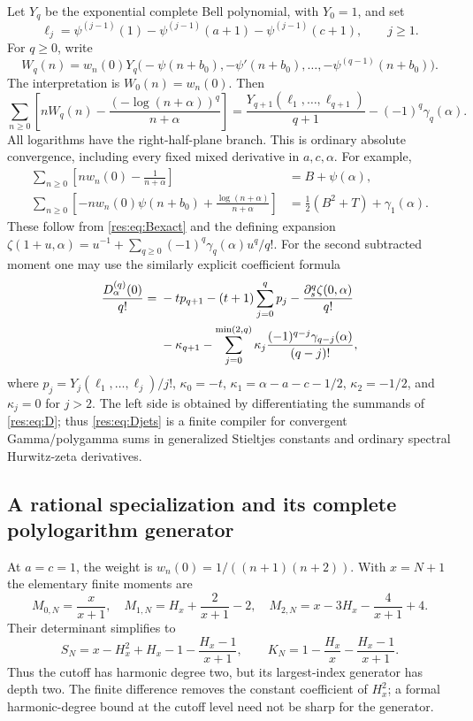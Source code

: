 Let $Y_q$ be the exponential complete Bell polynomial, with $Y_0=1$,
and set
\[
 \ell_j=\psi^{(j-1)}(1)-\psi^{(j-1)}(a+1)
                    -\psi^{(j-1)}(c+1),\qquad j\geq1.
\]
For $q\geq0$, write
\[
 W_q(n)=w_n(0)Y_q\bigl(-\psi(n+b_0),-\psi'(n+b_0),
                         \ldots,-\psi^{(q-1)}(n+b_0)\bigr).
\]
The interpretation is $W_0(n)=w_n(0)$.  Then
\begin{equation}
 \boxed{\sum_{n\geq0}\left[
 nW_q(n)-\frac{(-\log(n+\alpha))^q}{n+\alpha}\right]
 =\frac{Y_{q+1}(\ell_1,\ldots,\ell_{q+1})}{q+1}
       -(-1)^q\gamma_q(\alpha).}\label{res:eq:Stieltjes}
\end{equation}
All logarithms have the right-half-plane branch.  This is ordinary
absolute convergence, including every fixed mixed derivative in
$a,c,\alpha$.  For example,
\begin{align*}
 \sum_{n\geq0}\left[nw_n(0)-\frac1{n+\alpha}\right]
   &=B+\psi(\alpha),\\
 \sum_{n\geq0}\left[-nw_n(0)\psi(n+b_0)
                 +\frac{\log(n+\alpha)}{n+\alpha}\right]
   &=\tfrac12(B^2+T)+\gamma_1(\alpha).
\end{align*}
These follow from \eqref{res:eq:Bexact} and the defining expansion
$\zeta(1+u,\alpha)=u^{-1}+\sum_{q\geq0}(-1)^q\gamma_q(\alpha)u^q/q!$.
For the second subtracted moment one may use the similarly explicit
coefficient formula
\begin{align}
 \frac{D_\alpha^{(q)}(0)}{q!}
 ={}&-t p_{q+1}-(t+1)\sum_{j=0}^q p_j
     -\frac{\partial_s^q\zeta(0,\alpha)}{q!}\notag\\
 &-\kappa_{q+1}
     -\sum_{j=0}^{\min(2,q)}\kappa_j
                    \frac{(-1)^{q-j}\gamma_{q-j}(\alpha)}{(q-j)!},
 \label{res:eq:Djets}
\end{align}
where $p_j=Y_j(\ell_1,\ldots,\ell_j)/j!$,
$\kappa_0=-t$, $\kappa_1=\alpha-a-c-1/2$,
$\kappa_2=-1/2$, and $\kappa_j=0$ for $j>2$.
The left side is obtained by differentiating the summands of
\eqref{res:eq:D}; thus \eqref{res:eq:Djets} is a finite compiler
for convergent Gamma/polygamma sums in generalized Stieltjes
constants and ordinary spectral Hurwitz-zeta derivatives.

\subsection{A rational specialization and its complete polylogarithm generator}
At $a=c=1$, the weight is $w_n(0)=1/((n+1)(n+2))$.
With $x=N+1$ the elementary finite moments are
\[
 M_{0,N}=\frac{x}{x+1},\quad
 M_{1,N}=H_x+\frac2{x+1}-2,\quad
 M_{2,N}=x-3H_x-\frac4{x+1}+4.
\]
Their determinant simplifies to
\begin{equation}
 \boxed{S_N=x-H_x^2+H_x-1-\frac{H_x-1}{x+1},\qquad
 K_N=1-\frac{H_x}{x}-\frac{H_x-1}{x+1}.}\label{res:eq:rational}
\end{equation}
Thus the cutoff has harmonic degree two, but its largest-index
generator has depth two.  The finite difference removes the constant
coefficient of $H_x^2$; a formal harmonic-degree bound at the cutoff
level need not be sharp for the generator.

